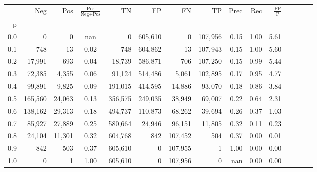 \begin{tabular}{rrrcrrrrrrrrrrr}
\toprule
{} &      Neg &     Pos & $\frac{\text{Pos}}{\text{Neg}+\text{Pos}}$ &       TN &       FP &       FN &       TP &  Prec &   Rec & $\frac{\text{FP}}{\text{P}}$ \\
p   &          &         &                                            &          &          &          &          &       &       &                              \\
\midrule
0.0 &        0 &       0 &                                        nan &        0 &  605,610 &        0 &  107,956 &  0.15 &  1.00 &                         5.61 \\
0.1 &      748 &      13 &                                       0.02 &      748 &  604,862 &       13 &  107,943 &  0.15 &  1.00 &                         5.60 \\
0.2 &   17,991 &     693 &                                       0.04 &   18,739 &  586,871 &      706 &  107,250 &  0.15 &  0.99 &                         5.44 \\
0.3 &   72,385 &   4,355 &                                       0.06 &   91,124 &  514,486 &    5,061 &  102,895 &  0.17 &  0.95 &                         4.77 \\
0.4 &   99,891 &   9,825 &                                       0.09 &  191,015 &  414,595 &   14,886 &   93,070 &  0.18 &  0.86 &                         3.84 \\
0.5 &  165,560 &  24,063 &                                       0.13 &  356,575 &  249,035 &   38,949 &   69,007 &  0.22 &  0.64 &                         2.31 \\
0.6 &  138,162 &  29,313 &                                       0.18 &  494,737 &  110,873 &   68,262 &   39,694 &  0.26 &  0.37 &                         1.03 \\
0.7 &   85,927 &  27,889 &                                       0.25 &  580,664 &   24,946 &   96,151 &   11,805 &  0.32 &  0.11 &                         0.23 \\
0.8 &   24,104 &  11,301 &                                       0.32 &  604,768 &      842 &  107,452 &      504 &  0.37 &  0.00 &                         0.01 \\
0.9 &      842 &     503 &                                       0.37 &  605,610 &        0 &  107,955 &        1 &  1.00 &  0.00 &                         0.00 \\
1.0 &        0 &       1 &                                       1.00 &  605,610 &        0 &  107,956 &        0 &   nan &  0.00 &                         0.00 \\
\bottomrule
\end{tabular}

